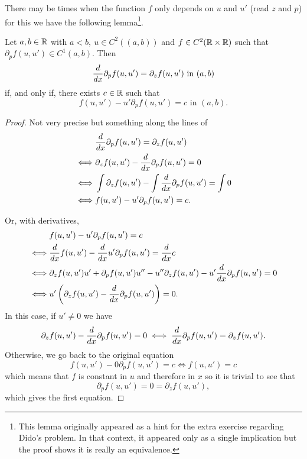 There may be times when the function $f$ only depends on $u$ and $u'$ (read $z$
and $p$) for this we have the following lemma\footnote{This lemma originally
appeared as a hint for the extra exercise regarding Dido's problem. In that
context, it appeared only as a single implication but the proof shows it is
really an equivalence.}.

\begin{lem}
  \label{lem:cv-f-not-on-x}
Let $a, b
\in \mathbb{R}$ with $a < b,\ u \in C^2((a, b))$ and $f \in C^2(\mathbb{R} \times \mathbb{R})$ such
that $\partial_p f(u, u') \in C^1(a, b)$. Then
  \[
    \frac{d}{dx} \partial_p f(u, u') = \partial_z f(u, u')\text{ in } (a, b)
  \]
  if, and only if, there exists $c \in \mathbb{R}$ such that
  \[
    f(u, u') - u' \partial_p f(u, u') = c\text{ in } (a, b).
  \]
\end{lem}

\begin{proof}
  Not very precise but something along the lines of
  \begin{align*}
         & \frac{d}{dx} \partial_p f(u, u') = \partial_z f(u, u') \\
    \iff & \partial_z f(u, u') - \frac{d}{dx} \partial_p f(u, u') = 0 \\
    \iff & \int \partial_z f(u, u') - \int \frac{d}{dx} \partial_p f(u, u') = \int 0 \\
    \iff & f(u, u') - u' \partial_p f(u, u') = c.
  \end{align*}

  Or, with derivatives,
  \begin{align*}
    & f(u, u') - u'\partial_p f(u, u') = c \\
    \iff & \frac{d}{dx} f(u, u') - \frac{d}{dx} u' \partial_p f(u, u') = \frac{d}{dx} c \\
    \iff & \partial_z f(u, u') u' + \partial_p f(u, u')u'' - u'' \partial_z f(u, u') - u' \frac{d}{dx} \partial_p f(u, u') = 0 \\
    \iff &u' \left( \partial_z f(u, u') - \frac{d}{dx} \partial_p f(u, u')\right) = 0.
  \end{align*}
  In this case, if $u' \neq 0$ we have
  \[
  \partial_z f(u, u') - \frac{d}{dx} \partial_p f(u, u') = 0 \iff
  \frac{d}{dx} \partial_p f(u, u') = \partial_z f(u, u').
  \]
  Otherwise, we go back to the original equation
  \[
    f(u, u') - 0 \partial_p f(u, u') = c \iff  f(u, u') = c
  \]
  which means that $f$ is constant in $u$ and therefore in $x$ so it is trivial to see that
  \[
    \partial_p f(u, u') = 0 = \partial_z f(u, u'),
  \]
  which gives the first equation.
\end{proof}


